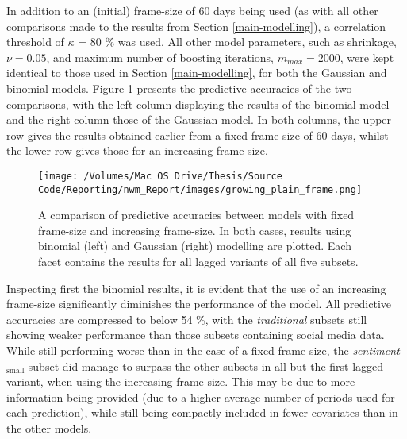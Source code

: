\documentclass{article}
\begin{document}
In addition to an (initial) frame-size of 60 days being used (as with all other comparisons made to the results from Section \ref{main-modelling}), a correlation threshold of $\kappa$ = 80 \% was used. All other model parameters, such as shrinkage, $\nu = 0.05$, and maximum number of boosting iterations, $m_{max} = 2000$, were kept identical to those used in Section \ref{main-modelling}, for both the Gaussian and binomial models. Figure \ref{fig:growing-frame} presents the predictive accuracies of the two comparisons, with the left column displaying the results of the binomial model and the right column those of the Gaussian model. In both columns, the upper row gives the results obtained earlier from a fixed frame-size of 60 days, whilst the lower row gives those for an increasing frame-size. 

\vspace{3mm}

\begin{figure}[htb]
\centering
\texttt{[image: /Volumes/Mac OS Drive/Thesis/Source Code/Reporting/nwm\_Report/images/growing\_plain\_frame.png]}
\caption[The predictive accuracies of GLMs using fixed versus increasing frame-size]{\label{fig:growing-frame}A comparison of predictive accuracies between models with fixed frame-size and increasing frame-size. In both cases, results using binomial (left) and Gaussian (right) modelling are plotted. Each facet contains the results for all lagged variants of all five subsets.}
\end{figure}

Inspecting first the binomial results, it is evident that the use of an increasing frame-size significantly diminishes the performance of the model. All predictive accuracies are compressed to below 54 \%, with the \emph{traditional} subsets still showing weaker performance than those subsets containing social media data. While still performing worse than in the case of a fixed frame-size, the \emph{sentiment$_{\text{small}}$} subset did manage to surpass the other subsets in all but the first lagged variant, when using the increasing frame-size. This may be due to more information being provided (due to a higher average number of periods used for each prediction), while still being compactly included in fewer covariates than in the other models.
\end{document}
